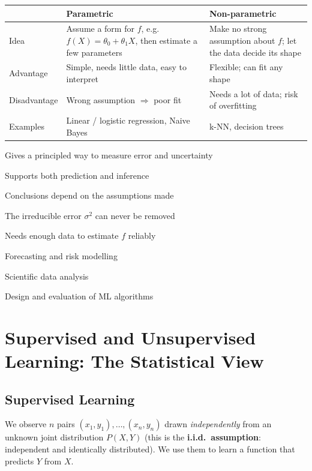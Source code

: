 \begin{center}
\begin{tabular}{@{}p{3cm}p{5.4cm}p{5.4cm}@{}}
\toprule
 & \textbf{Parametric} & \textbf{Non-parametric}\\
\midrule
Idea & Assume a form for $f$, e.g.\ $f(X)=\theta_0+\theta_1X$, then estimate a few parameters & Make no strong assumption about $f$; let the data decide its shape\\
Advantage & Simple, needs little data, easy to interpret & Flexible; can fit any shape\\
Disadvantage & Wrong assumption $\Rightarrow$ poor fit & Needs a lot of data; risk of overfitting\\
Examples & Linear / logistic regression, Naive Bayes & k-NN, decision trees\\
\bottomrule
\end{tabular}
\end{center}


{\item Gives a principled way to measure error and uncertainty
 \item Supports both prediction and inference}
{\item Conclusions depend on the assumptions made
 \item The irreducible error $\sigma^2$ can never be removed
 \item Needs enough data to estimate $f$ reliably}
{\item Forecasting and risk modelling
 \item Scientific data analysis
 \item Design and evaluation of ML algorithms}

\section{Supervised and Unsupervised Learning: The Statistical View}

\subsection{Supervised Learning}

We observe $n$ pairs $(x_1,y_1),\dots,(x_n,y_n)$ drawn \emph{independently} from an unknown joint distribution $P(X,Y)$ (this is the \textbf{i.i.d.\ assumption}: independent and identically distributed). We use them to learn a function that predicts $Y$ from $X$.

